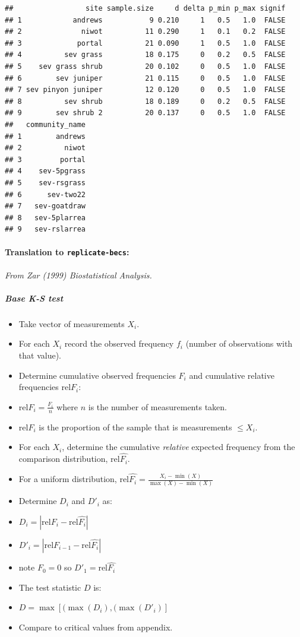 \documentclass[]{article}
\providecommand{\tightlist}{%
  \setlength{\itemsep}{0pt}\setlength{\parskip}{0pt}}
\let\oldparagraph\paragraph
\renewcommand{\paragraph}[1]{\oldparagraph{#1}\mbox{}}
\let\oldsubparagraph\subparagraph
\renewcommand{\subparagraph}[1]{\oldsubparagraph{#1}\mbox{}}
\begin{document}
\begin{verbatim}
##                 site sample.size     d delta p_min p_max signif
## 1            andrews           9 0.210     1   0.5   1.0  FALSE
## 2              niwot          11 0.290     1   0.1   0.2  FALSE
## 3             portal          21 0.090     1   0.5   1.0  FALSE
## 4          sev grass          18 0.175     0   0.2   0.5  FALSE
## 5    sev grass shrub          20 0.102     0   0.5   1.0  FALSE
## 6        sev juniper          21 0.115     0   0.5   1.0  FALSE
## 7 sev pinyon juniper          12 0.120     0   0.5   1.0  FALSE
## 8          sev shrub          18 0.189     0   0.2   0.5  FALSE
## 9        sev shrub 2          20 0.137     0   0.5   1.0  FALSE
##   community_name
## 1        andrews
## 2          niwot
## 3         portal
## 4    sev-5pgrass
## 5    sev-rsgrass
## 6      sev-two22
## 7   sev-goatdraw
## 8   sev-5plarrea
## 9   sev-rslarrea
\end{verbatim}

\paragraph{\texorpdfstring{Translation to
\texttt{replicate-becs}:}{Translation to replicate-becs:}}\label{translation-to-replicate-becs-6}

\emph{From Zar (1999) \emph{Biostatistical Analysis}.}

\subparagraph{Base K-S test}\label{base-k-s-test}

\begin{itemize}
\tightlist
\item
  Take vector of measurements \(X_i\).
\item
  For each \(X_i\) record the observed frequency \(f_i\) (number of
  observations with that value).
\item
  Determine cumulative observed frequencies \(F_i\) and cumulative
  relative frequencies \(\textrm{rel}F_i\):
\item
  \(\textrm{rel}F_i = \frac{F_i}{n}\) where \(n\) is the number of
  measurements taken.
\item
  \(\textrm{rel}F_i\) is the proportion of the sample that is
  measurements \(\leq X_i\).
\item
  For each \(X_i\), determine the cumulative \emph{relative} expected
  frequency from the comparison distribution, \(\textrm{rel}\hat{F_i}\).
\item
  For a uniform distribution,
  \(\textrm{rel}\hat{F_i} = \frac{X_i - \min(X)}{\max(X) - \min(X)}\)
\item
  Determine \(D_i\) and \(D'_i\) as:
\item
  \(D_i = |{\textrm{rel}F_i - \textrm{rel}\hat{F_i}}|\)
\item
  \(D'_i = |{\textrm{rel}F_{i-1} - \textrm{rel}\hat{F_i}}|\)
\item
  note \(F_0 = 0\) so \(D'_1 = \textrm{rel}\hat{F_i}\)
\item
  The test statistic \(D\) is:
\item
  \(D = \max[(\max(D_i), (\max(D'_i)]\)
\item
  Compare to critical values from appendix.
\end{itemize}
\end{document}
